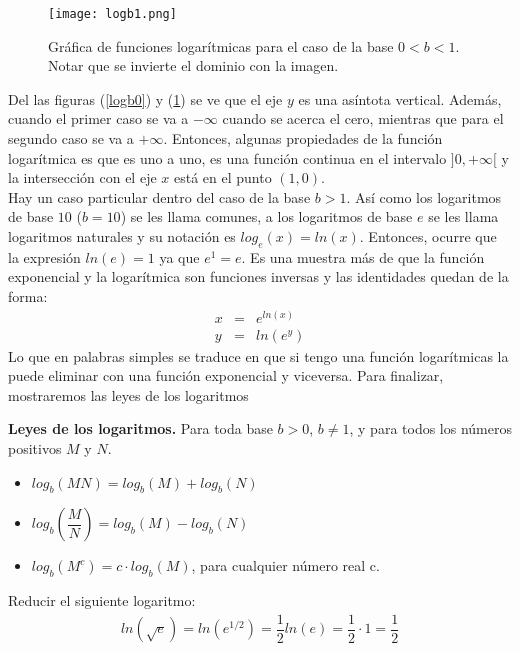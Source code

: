  \begin{center}
\begin{figure}[h!]
\centering
\texttt{[image: logb1.png]}
\caption[Gráfica de funciones logarítmicas para el caso de la base $0<b<1$]{Gráfica de funciones logarítmicas para el caso de la base $0<b<1$. Notar que se invierte el dominio con la imagen.} \label{logb1}
\end{figure}
\end{center}

Del las figuras (\ref{logb0}) y (\ref{logb1}) se ve que el eje $y$ es una asíntota vertical. Además, cuando el primer caso se va a $-\infty$ cuando se acerca el cero, mientras que para el segundo caso se va a $+\infty$. Entonces, algunas propiedades de la función logarítmica es que es uno a uno, es una función continua en el intervalo $]0,+\infty[$ y la intersección con el eje $x$ está en el punto $(1,0)$.\\

Hay un caso particular dentro del caso de la base $b>1$. Así como los logaritmos de base $10$ ($b=10$) se les llama comunes, a los logaritmos de base $e$ se les llama logaritmos naturales y su notación es $log_{e}(x)=ln(x)$. Entonces, ocurre que la expresión $ln(e)=1$ ya que $e^{1}=e$. Es una muestra más de que la función exponencial y la logarítmica son funciones inversas y las identidades quedan de la forma:
\begin{eqnarray}
x&=&e^{ln(x)}\\
y&=&ln(e^{y})
\end{eqnarray}
Lo que en palabras simples se traduce en que si tengo una función logarítmicas la puede eliminar con una función exponencial y viceversa. Para finalizar, mostraremos las leyes de los logaritmos

\begin{mydef}
\textbf{Leyes de los logaritmos. } Para toda base $b>0$, $b\neq 1$, y para todos los números positivos $M$ y $N$.
\begin{itemize}
	\item $log_{b}(MN)=log_{b}(M)+log_{b}(N)$
	\item $log_{b}\left(\dfrac{M}{N}\right)=log_{b}(M)-log_{b}(N)$
	\item $log_{b}(M^{c})=c\cdot log_{b}(M)$, para cualquier número real c.\\
\end{itemize}
\end{mydef}

\begin{myexample}
Reducir el siguiente logaritmo:
\begin{eqnarray}
ln(\sqrt{e})=ln(e^{1/2})=\dfrac{1}{2}ln(e)=\dfrac{1}{2}\cdot 1=\dfrac{1}{2}
\end{eqnarray}
\end{myexample}


